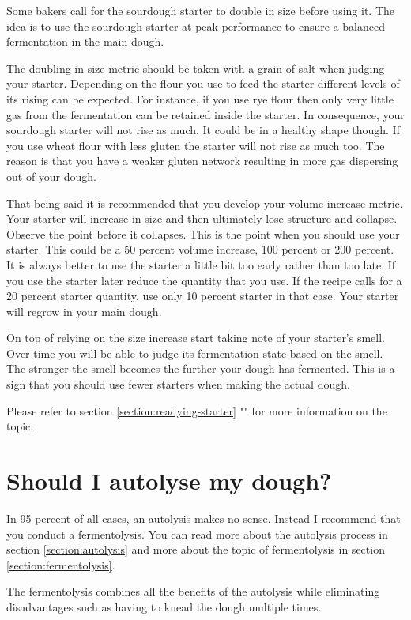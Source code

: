 Some bakers call for the sourdough starter to
double in size before using it.
The idea is to use the sourdough starter at
peak performance to ensure a
balanced fermentation in the main dough.

The doubling in size metric should be
taken with a grain of salt when judging
your starter. Depending on the flour
you use to feed the starter different levels
of its rising can be expected.
For instance, if you use rye flour then only
very little gas from the
fermentation can be retained inside the
starter. In consequence, your
sourdough starter will not rise as much. It
could be in a healthy shape
though. If you use wheat flour with less gluten
the starter will not rise as
much too. The reason is that you have a weaker
gluten network resulting in
more gas dispersing out of your dough.

That being said it is recommended that you develop
your volume increase
metric. Your starter will increase in size and then
ultimately lose structure
and collapse. Observe the point before it collapses.
This is the point when
you should use your starter. This could be a
50 percent volume increase, 100
percent or 200 percent. It is always better to use
the starter a little bit
too early rather than too late. If you use the
starter later reduce the
quantity that you use. If the recipe calls for a 20
percent starter quantity,
use only 10
percent starter in that case. Your starter will
regrow in your main dough.

On top of relying on the size increase start
taking note of your starter's
smell. Over time you will be able to judge its
fermentation state based on the
smell. The stronger the smell becomes the further
your dough has fermented.
This is a sign that you should use fewer starters
when making the actual dough.

Please refer to section \ref{section:readying-starter} ""
for more information on the topic.

\section{Should I autolyse my dough?}

In 95 percent of all cases, an autolysis
makes no sense. Instead I recommend
that you conduct a fermentolysis. You
can read more about the autolysis process in
section \ref{section:autolysis} and
more about the topic of fermentolysis
in section \ref{section:fermentolysis}.

The fermentolysis combines all the benefits
of the autolysis while eliminating disadvantages
such as having to knead the dough multiple times.

